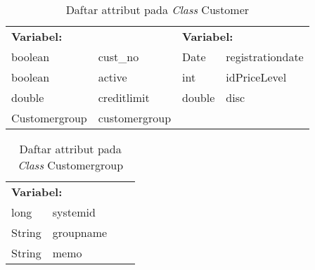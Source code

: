\begin{table}[H]
	\caption{Daftar attribut pada \textit{Class} Customer}
	\centering
	\small
	\begin{adjustbox}{width=1\textwidth}	
		\begin{tabular}{|p{4cm} p{2.1cm} p{3cm} p{3.1cm}|}
			\hline
			\multicolumn{2}{|l}{\textbf{Variabel:}}&\multicolumn{2}{l|}{\textbf{Variabel:}}\\
			boolean&cust\_no&Date&registrationdate\\
			boolean&active&int&idPriceLevel\\
			double&creditlimit&double&disc\\
			Customergroup&customergroup&&\\
			\hline
		\end{tabular}
	\end{adjustbox}
\end{table}

\begin{table}[H]
	\caption{Daftar attribut pada \textit{Class} Customergroup}
	\centering
	\small
	\begin{adjustbox}{width=1\textwidth}	
		\begin{tabular}{|p{4cm} p{2.1cm} p{3cm} p{3.1cm}|}
			\hline
			\multicolumn{2}{|l}{\textbf{Variabel:}}&\multicolumn{2}{l|}{}\\
			long&systemid&&\\
			String&groupname&&\\
			String&memo&&\\
			\hline
		\end{tabular}
	\end{adjustbox}
\end{table}

